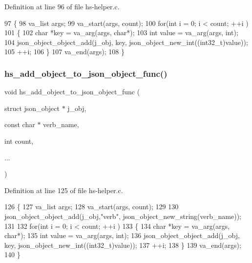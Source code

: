 Definition at line 96 of file hs-\/helper.\+c.


\begin{DoxyCode}
97 \{
98     va\_list args;
99     va\_start(args, count);
100     \textcolor{keywordflow}{for}(\textcolor{keywordtype}{int} i = 0; i < count; ++i )
101     \{
102         \textcolor{keywordtype}{char} *key = va\_arg(args, \textcolor{keywordtype}{char}*);
103         \textcolor{keywordtype}{int} value = va\_arg(args, \textcolor{keywordtype}{int});
104         json\_object\_object\_add(j\_obj, key, json\_object\_new\_int((int32\_t)value));
105         ++i;
106     \}
107     va\_end(args);
108 \}
\end{DoxyCode}
\mbox{\label{hs-helper_8c_ae83604a37134e7bdee3ce4f10bb0b47a}} 
\subsubsection{\texorpdfstring{hs\+\_\+add\+\_\+object\+\_\+to\+\_\+json\+\_\+object\+\_\+func()}{hs\_add\_object\_to\_json\_object\_func()}}
{\footnotesize\ttfamily void hs\+\_\+add\+\_\+object\+\_\+to\+\_\+json\+\_\+object\+\_\+func (\begin{DoxyParamCaption}\item[{struct json\+\_\+object $\ast$}]{j\+\_\+obj,  }\item[{const char $\ast$}]{verb\+\_\+name,  }\item[{int}]{count,  }\item[{}]{... }\end{DoxyParamCaption})}



Definition at line 125 of file hs-\/helper.\+c.


\begin{DoxyCode}
126 \{
127     va\_list args;
128     va\_start(args, count);
129 
130     json\_object\_object\_add(j\_obj,\textcolor{stringliteral}{"verb"}, json\_object\_new\_string(verb\_name));
131 
132     \textcolor{keywordflow}{for}(\textcolor{keywordtype}{int} i = 0; i < count; ++i )
133     \{
134         \textcolor{keywordtype}{char} *key = va\_arg(args, \textcolor{keywordtype}{char}*);
135         \textcolor{keywordtype}{int} value = va\_arg(args, \textcolor{keywordtype}{int});
136         json\_object\_object\_add(j\_obj, key, json\_object\_new\_int((int32\_t)value));
137         ++i;
138     \}
139     va\_end(args);
140 \}
\end{DoxyCode}
\mbox{\label{hs-helper_8c_a8777c53f1d4d5412f19b134ad85ffedf}} 
